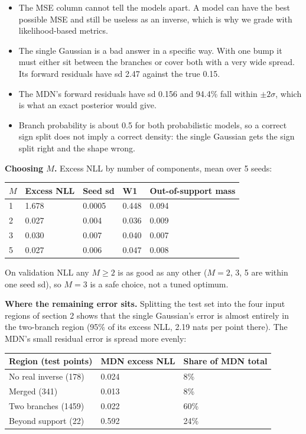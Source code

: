 \documentclass[11pt,a4paper]{article}
\begin{document}
\begin{itemize}
\item The MSE column cannot tell the models apart. A model can have the best possible MSE and still be useless as an inverse, which is why we grade with likelihood-based metrics.
\item The single Gaussian is a bad answer in a specific way. With one bump it must either sit between the branches or cover both with a very wide spread. Its forward residuals have sd 2.47 against the true 0.15.
\item The MDN's forward residuals have sd 0.156 and 94.4\% fall within $\pm 2\sigma$, which is what an exact posterior would give.
\item Branch probability is about 0.5 for both probabilistic models, so a correct sign split does not imply a correct density: the single Gaussian gets the sign split right and the shape wrong.
\end{itemize}

\textbf{Choosing $M$.} Excess NLL by number of components, mean over 5 seeds:

\begin{table}[H]
\centering\small
\begin{tabular}{lllll}
\toprule
\textbf{$M$} & \textbf{Excess NLL} & \textbf{Seed sd} & \textbf{W1} & \textbf{Out-of-support mass} \\
\midrule
1 & 1.678 & 0.0005 & 0.448 & 0.094 \\
2 & 0.027 & 0.004 & 0.036 & 0.009 \\
3 & 0.030 & 0.007 & 0.040 & 0.007 \\
5 & 0.027 & 0.006 & 0.047 & 0.008 \\
\bottomrule
\end{tabular}
\end{table}

On validation NLL any $M \ge  2$ is as good as any other ($M = 2$, 3, 5 are within one seed sd), so $M = 3$ is a safe choice, not a tuned optimum.

\textbf{Where the remaining error sits.} Splitting the test set into the four input regions of section 2 shows that the single Gaussian's error is almost entirely in the two-branch region (95\% of its excess NLL, 2.19 nats per point there). The MDN's small residual error is spread more evenly:

\begin{table}[H]
\centering\small
\begin{tabular}{lll}
\toprule
\textbf{Region (test points)} & \textbf{MDN excess NLL} & \textbf{Share of MDN total} \\
\midrule
No real inverse (178) & 0.024 & 8\% \\
Merged (341) & 0.013 & 8\% \\
Two branches (1459) & 0.022 & 60\% \\
Beyond support (22) & 0.592 & 24\% \\
\bottomrule
\end{tabular}
\end{table}
\end{document}
